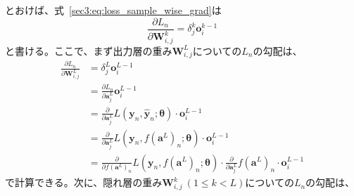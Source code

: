 \documentclass[12pt]{jarticle}
\numberwithin{equation}{section}    %
\numberwithin{figure}{section}      %
\numberwithin{table}{section}      %
\begin{document}
とおけば、式~\eqref{sec3:eq:loss_sample_wise_grad}は
\begin{equation}
    \frac{\partial L_{n}}{\partial \bm{W}_{i, j}^{k}} = \delta_{j}^{k} \bm{o}_{i}^{k - 1}
\end{equation}
と書ける。ここで、まず出力層の重み$\bm{W}_{i, j}^{L}$についての$L_{n}$の勾配は、
\begin{align}
    \frac{\partial L_{n}}{\partial \bm{W}_{i, j}^{L}} & = \delta_{j}^{L} \bm{o}_{i}^{L - 1}                                                                                                                                                   \\
                                                      & = \frac{\partial L_{n}}{\partial \bm{a}_{j}^{L}} \bm{o}_{i}^{L - 1}                                                                                                                   \\
                                                      & = \frac{\partial}{\partial \bm{a}_{j}^{L}} L(\bm{y}_{n}, \hat{\bm{y}}_{n}; \bm{\theta}) \cdot \bm{o}_{i}^{L - 1}                                                                      \\
                                                      & = \frac{\partial}{\partial \bm{a}_{j}^{L}} L(\bm{y}_{n}, f(\bm{a}^{L})_{n}; \bm{\theta}) \cdot \bm{o}_{i}^{L - 1}                                                                     \\
                                                      & = \frac{\partial}{\partial f(\bm{a}^{L})_{n}} L(\bm{y}_{n}, f(\bm{a}^{L})_{n}; \bm{\theta}) \cdot \frac{\partial}{\partial \bm{a}_{j}^{L}} f(\bm{a}^{L})_{n} \cdot \bm{o}_{i}^{L - 1}
\end{align}
で計算できる。次に、隠れ層の重み$\bm{W}_{i, j}^{k} ~ (1 \le k < L)$についての$L_{n}$の勾配は、
\end{document}
